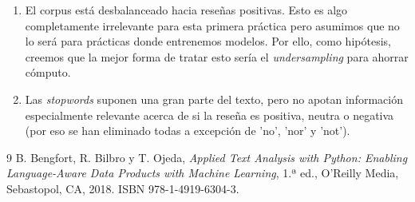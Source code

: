 \documentclass[10pt,a4paper]{article}
\begin{document}
\begin{enumerate}
    \item El corpus está desbalanceado hacia reseñas positivas. Esto es algo completamente irrelevante para esta 
    primera práctica pero asumimos que no lo será para prácticas donde entrenemos modelos. Por ello, como hipótesis, 
    creemos que la mejor forma de tratar esto sería el \textit{undersampling} para ahorrar cómputo. 
    \item Las \textit{stopwords} suponen una gran parte del texto, pero no apotan información especialmente relevante 
    acerca de si la reseña es positiva, neutra o negativa (por eso se han eliminado todas a excepción de 'no', 'nor' y 
    'not'). 

\end{enumerate}

\newpage

\begin{thebibliography}{9}
B. Bengfort, R. Bilbro y T. Ojeda,
\textit{Applied Text Analysis with Python: Enabling Language-Aware Data Products with Machine Learning},
1.ª ed., O'Reilly Media, Sebastopol, CA, 2018. ISBN 978-1-4919-6304-3.

\end{thebibliography}
\end{document}
